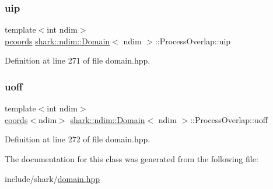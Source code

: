 \subsubsection{\texorpdfstring{uip}{uip}}
{\footnotesize\ttfamily template$<$int ndim$>$ \\
\hyperlink{classshark_1_1ndim_1_1_domain_a9684ccd8af33cff7639c782290ac37ee}{pcoords} \hyperlink{classshark_1_1ndim_1_1_domain}{shark\+::ndim\+::\+Domain}$<$ ndim $>$\+::Process\+Overlap\+::uip\hspace{0.3cm}{\ttfamily [private]}}



Definition at line 271 of file domain.\+hpp.

\hypertarget{classshark_1_1ndim_1_1_domain_1_1_process_overlap_a9c5f411b46b6a0c7ffab30b43898371e}{}\label{classshark_1_1ndim_1_1_domain_1_1_process_overlap_a9c5f411b46b6a0c7ffab30b43898371e} 
\subsubsection{\texorpdfstring{uoff}{uoff}}
{\footnotesize\ttfamily template$<$int ndim$>$ \\
\hyperlink{structshark_1_1ndim_1_1coords}{coords}$<$ndim$>$ \hyperlink{classshark_1_1ndim_1_1_domain}{shark\+::ndim\+::\+Domain}$<$ ndim $>$\+::Process\+Overlap\+::uoff\hspace{0.3cm}{\ttfamily [private]}}



Definition at line 272 of file domain.\+hpp.



The documentation for this class was generated from the following file\+:\begin{DoxyCompactItemize}
\item 
include/shark/\hyperlink{domain_8hpp}{domain.\+hpp}\end{DoxyCompactItemize}
